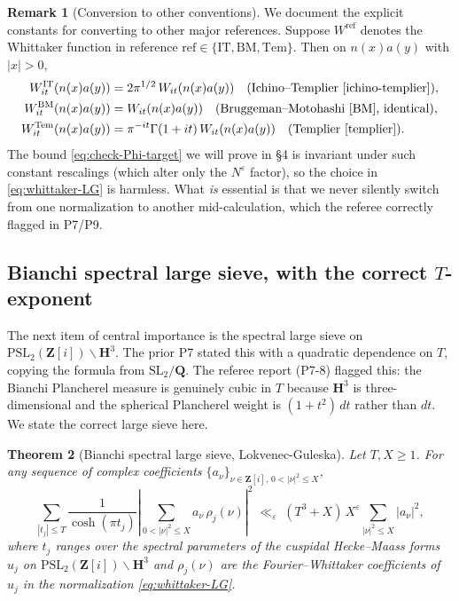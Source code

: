 \documentclass[11pt]{article}
\newtheorem{theorem}{Theorem}[section]
\theoremstyle{definition}
\newtheorem{remark}[theorem]{Remark}
\newcommand{\Z}{\mathbf{Z}}
\newcommand{\Q}{\mathbf{Q}}
\newcommand{\HH}{\mathbf{H}}
\newcommand{\Zi}{\Z[i]}
\begin{document}
\begin{remark}[Conversion to other conventions]\label{rem:whittaker-conversion}
We document the explicit constants for converting to other major references. Suppose $W^{\mathrm{ref}}$ denotes the Whittaker function in reference $\mathrm{ref} \in \{\mathrm{IT}, \mathrm{BM}, \mathrm{Tem}\}$. Then on $n(x)a(y)$ with $|x| > 0$,
\begin{align}
    W^{\mathrm{IT}}_{it}(n(x)a(y)) &= 2\pi^{1/2}\, W_{it}(n(x)a(y))   \quad \text{(Ichino--Templier \cite{ichino-templier})}, \label{eq:conv-IT}\\
    W^{\mathrm{BM}}_{it}(n(x)a(y)) &= W_{it}(n(x)a(y))    \quad \text{(Bruggeman--Motohashi \cite{BM}, identical)}, \label{eq:conv-BM}\\
    W^{\mathrm{Tem}}_{it}(n(x)a(y)) &= \pi^{-it} \Gamma(1+it)\, W_{it}(n(x)a(y))  \quad \text{(Templier \cite{templier})}. \label{eq:conv-Tem}
\end{align}
The bound \eqref{eq:check-Phi-target} we will prove in \S4 is invariant under such constant rescalings (which alter only the $N^\varepsilon$ factor), so the choice in \eqref{eq:whittaker-LG} is harmless. What \emph{is} essential is that we never silently switch from one normalization to another mid-calculation, which the referee correctly flagged in P7/P9.
\end{remark}

\subsection{Bianchi spectral large sieve, with the correct $T$-exponent}\label{ssec:large-sieve}

The next item of central importance is the spectral large sieve on $\mathrm{PSL}_2(\Zi)\backslash\HH^3$. The prior P7 stated this with a quadratic dependence on $T$, copying the formula from $\mathrm{SL}_2/\Q$. The referee report (P7-8) flagged this: the Bianchi Plancherel measure is genuinely cubic in $T$ because $\HH^3$ is three-dimensional and the spherical Plancherel weight is $(1+t^2)\,dt$ rather than $dt$. We state the correct large sieve here.

\begin{theorem}[Bianchi spectral large sieve, Lokvenec-Guleska]\label{thm:LG-large-sieve}
Let $T,X \ge 1$. For any sequence of complex coefficients $\{a_\nu\}_{\nu \in \Zi,\, 0<|\nu|^2 \le X}$,
\begin{equation}\label{eq:LG-large-sieve}
   \sum_{|t_j| \le T}\frac{1}{\cosh(\pi t_j)}\left|\sum_{0<|\nu|^2 \le X} a_\nu\, \rho_j(\nu)\right|^2
   \;\ll_\varepsilon\;
   (T^3 + X)\, X^\varepsilon \sum_{|\nu|^2 \le X} |a_\nu|^2,
\end{equation}
where $t_j$ ranges over the spectral parameters of the cuspidal Hecke--Maass forms $u_j$ on $\mathrm{PSL}_2(\Zi)\backslash\HH^3$ and $\rho_j(\nu)$ are the Fourier--Whittaker coefficients of $u_j$ in the normalization \eqref{eq:whittaker-LG}.
\end{theorem}
\end{document}
